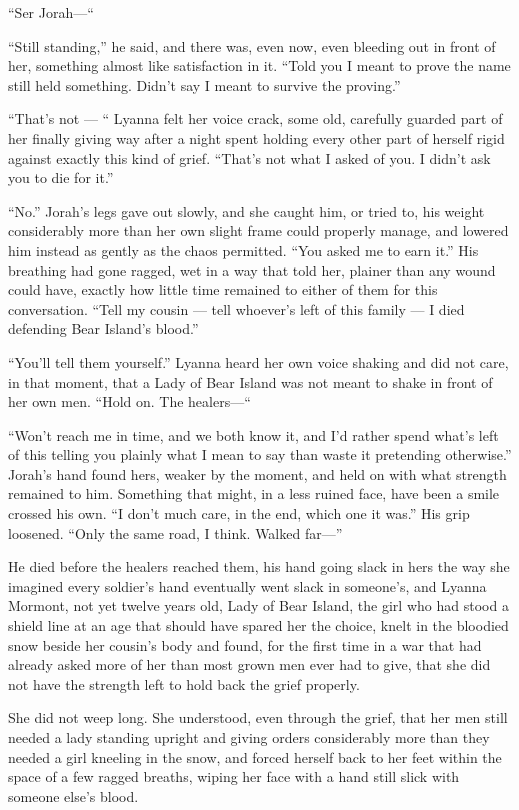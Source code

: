“Ser Jorah—“

“Still standing,” he said, and there was, even now, even bleeding out in front of her, something almost like satisfaction in it. “Told you I meant to prove the name still held something. Didn’t say I meant to survive the proving.”

“That’s not — “ Lyanna felt her voice crack, some old, carefully guarded part of her finally giving way after a night spent holding every other part of herself rigid against exactly this kind of grief. “That’s not what I asked of you. I didn’t ask you to die for it.”

“No.” Jorah’s legs gave out slowly, and she caught him, or tried to, his weight considerably more than her own slight frame could properly manage, and lowered him instead as gently as the chaos permitted. “You asked me to earn it.” His breathing had gone ragged, wet in a way that told her, plainer than any wound could have, exactly how little time remained to either of them for this conversation. “Tell my cousin — tell whoever’s left of this family — I died defending Bear Island’s blood.”

“You’ll tell them yourself.” Lyanna heard her own voice shaking and did not care, in that moment, that a Lady of Bear Island was not meant to shake in front of her own men. “Hold on. The healers—“

“Won’t reach me in time, and we both know it, and I’d rather spend what’s left of this telling you plainly what I mean to say than waste it pretending otherwise.” Jorah’s hand found hers, weaker by the moment, and held on with what strength remained to him. Something that might, in a less ruined face, have been a smile crossed his own. “I don’t much care, in the end, which one it was.” His grip loosened. “Only the same road, I think. Walked far—”

\sceneBreak

He died before the healers reached them, his hand going slack in hers the way she imagined every soldier’s hand eventually went slack in someone’s, and Lyanna Mormont, not yet twelve years old, Lady of Bear Island, the girl who had stood a shield line at an age that should have spared her the choice, knelt in the bloodied snow beside her cousin’s body and found, for the first time in a war that had already asked more of her than most grown men ever had to give, that she did not have the strength left to hold back the grief properly.

She did not weep long. She understood, even through the grief, that her men still needed a lady standing upright and giving orders considerably more than they needed a girl kneeling in the snow, and forced herself back to her feet within the space of a few ragged breaths, wiping her face with a hand still slick with someone else’s blood.

